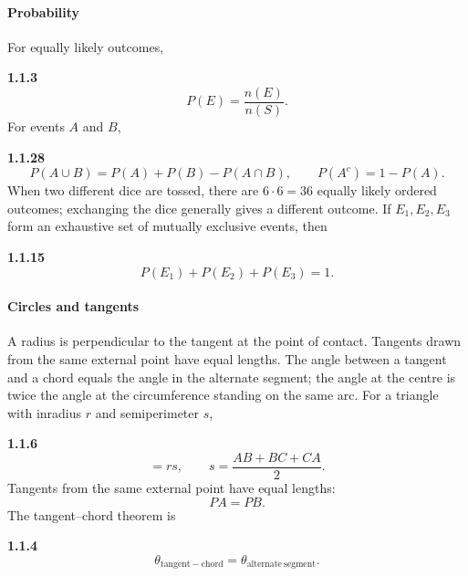 \paragraph*{Probability}
For equally likely outcomes,
\setcounter{qcurrent}{3}\setcounter{equation}{0}
\par\noindent\textbf{1.1.3}\quad
\begin{equation}
P(E)=\frac{n(E)}{n(S)}.
\label{eq:prob-classical}
\end{equation}
For events $A$ and $B$,
\setcounter{qcurrent}{28}\setcounter{equation}{0}
\par\noindent\textbf{1.1.28}\quad
\begin{equation}
P(A\cup B)=P(A)+P(B)-P(A\cap B),\qquad P(A^c)=1-P(A).
\label{eq:prob-union}
\end{equation}
When two different dice are tossed, there are $6\cdot6=36$ equally likely ordered outcomes; exchanging the dice generally gives a different outcome.
If $E_1,E_2,E_3$ form an exhaustive set of mutually exclusive events, then
\par\noindent\textbf{1.1.15}\quad
\begin{equation}
P(E_1)+P(E_2)+P(E_3)=1.\tag{1.1.15.1}\label{eq:three-events}
\end{equation}

\paragraph*{Circles and tangents}
A radius is perpendicular to the tangent at the point of contact. Tangents drawn from the same external point have equal lengths. The angle between a tangent and a chord equals the angle in the alternate segment; the angle at the centre is twice the angle at the circumference standing on the same arc. For a triangle with inradius $r$ and semiperimeter $s$,
\setcounter{qcurrent}{6}\setcounter{equation}{0}
\par\noindent\textbf{1.1.6}\quad
\begin{equation}
[ABC]=rs,\qquad s=\frac{AB+BC+CA}{2}.
\label{eq:triangle-inradius}
\end{equation}
Tangents from the same external point have equal lengths:
\begin{equation}
PA=PB.\tag{1.1.6.2}\label{eq:equal-tangents}
\end{equation}
The tangent--chord theorem is
\par\noindent\textbf{1.1.4}\quad
\begin{equation}
\theta_{\mathrm{tangent-chord}}=\theta_{\mathrm{alternate\ segment}}.\tag{1.1.4.1}\label{eq:tangent-chord}
\end{equation}

